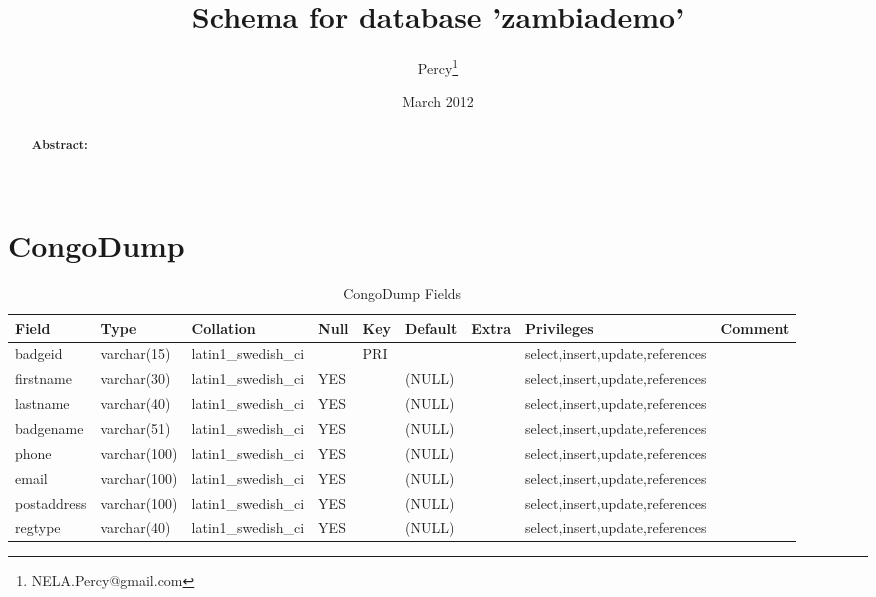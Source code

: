 \documentclass[captions=tablesignature]{scrartcl}
\author{Percy\thanks{NELA.Percy@gmail.com}}
\date{March 2012}
\title{Schema for database 'zambiademo'}
\begin{document}
\maketitle
\tableofcontents

\thispagestyle{fancy}
\renewcommand{\headrulewidth}{0pt}
\renewcommand{\footrulewidth}{0pt}
\lhead{}
\rhead{}
\chead{}
\lfoot{}
\cfoot{}
\rfoot{}
\begin{abstract}
\vspace{5cm}
{\LARGE{\textbf{Abstract:\\}}}
 \\
\end{abstract}
\newpage
\renewcommand{\headrulewidth}{1pt}
\renewcommand{\footrulewidth}{1pt}
\rfoot{\thepage}
\setcounter{tocdepth}{2}
\tableofcontents
\newpage
{}
\section{CongoDump}
\label{sec-1}

\begin{table}[htb]
\caption{\label{tbl:congodumpfields}CongoDump Fields}
\centering
\begin{tabular}{lllllllll}
\hline
Field & Type & Collation & Null & Key & Default & Extra & Privileges & Comment\\
\hline
badgeid & varchar(15) & latin1\_swedish\_ci &  & PRI &  &  & select,insert,update,references & \\
firstname & varchar(30) & latin1\_swedish\_ci & YES &  & (NULL) &  & select,insert,update,references & \\
lastname & varchar(40) & latin1\_swedish\_ci & YES &  & (NULL) &  & select,insert,update,references & \\
badgename & varchar(51) & latin1\_swedish\_ci & YES &  & (NULL) &  & select,insert,update,references & \\
phone & varchar(100) & latin1\_swedish\_ci & YES &  & (NULL) &  & select,insert,update,references & \\
email & varchar(100) & latin1\_swedish\_ci & YES &  & (NULL) &  & select,insert,update,references & \\
postaddress & varchar(100) & latin1\_swedish\_ci & YES &  & (NULL) &  & select,insert,update,references & \\
regtype & varchar(40) & latin1\_swedish\_ci & YES &  & (NULL) &  & select,insert,update,references & \\
\hline
\end{tabular}
\end{table}
\end{document}
